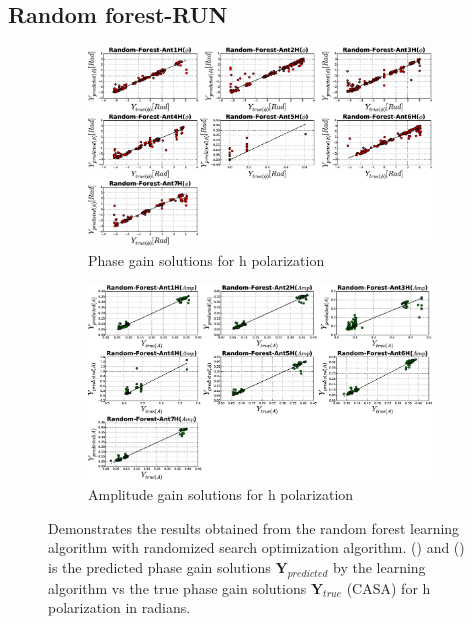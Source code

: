 \subsection{Random forest-RUN}
\begin{figure}[H]
   \centering
    \begin{subfigure}[t]{0.52\textheight}
        
        \includegraphics[width=\textwidth]{images/Random-ForestHphase.eps} 
        \caption{Phase gain solutions for h polarization} \label{A2}
    \end{subfigure}
    
      \begin{subfigure}[t]{0.52\textheight}
       
        \includegraphics[width=\textwidth]{images/Random-ForestHamp.eps} 
        \caption{Amplitude gain solutions for h polarization} \label{B2}
    \end{subfigure}
    \caption{Demonstrates the results obtained from the random forest learning algorithm with randomized search optimization algorithm. () and () is the predicted phase gain solutions $\textbf{Y}_{predicted}$ by the learning algorithm vs the true phase gain solutions $\textbf{Y}_{true}$ (CASA) for h polarization in radians.}
    \end{figure}
    
